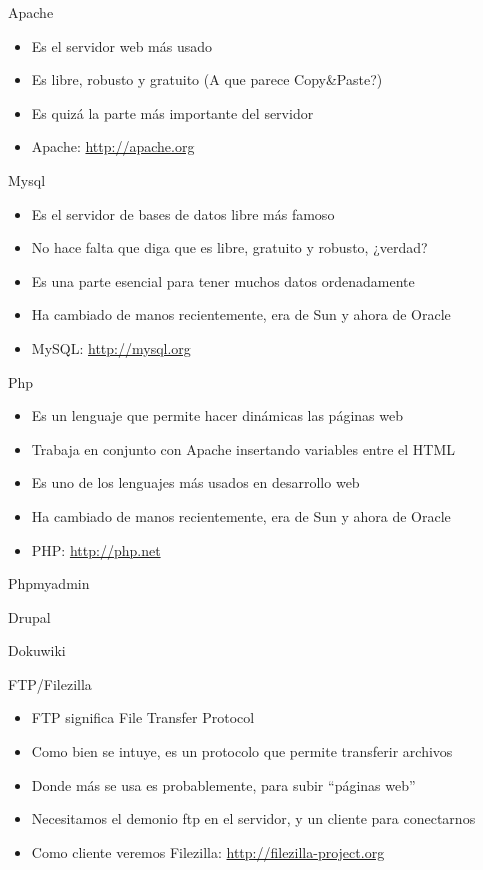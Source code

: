 \documentclass[spanish]{beamer}
\begin{document}
\begin{frame}{Apache}
\begin{itemize}
\item Es el servidor web más usado
\item Es libre, robusto y gratuito (A que parece Copy\&Paste?)
\item Es quizá la parte más importante del servidor
\item Apache: \url{http://apache.org}
\end{itemize}
\end{frame}
\begin{frame}{Mysql}
\begin{itemize}
\item Es el servidor de bases de datos libre más famoso
\item No hace falta que diga que es libre, gratuito y robusto, ¿verdad?
\item Es una parte esencial para tener muchos datos ordenadamente
\item Ha cambiado de manos recientemente, era de Sun y ahora de Oracle
\item MySQL: \url{http://mysql.org}
\end{itemize}
\end{frame}
\begin{frame}{Php}
\begin{itemize}
\item Es un lenguaje que permite hacer dinámicas las páginas web
\item Trabaja en conjunto con Apache insertando variables entre el HTML
\item Es uno de los lenguajes más usados en desarrollo web
\item Ha cambiado de manos recientemente, era de Sun y ahora de Oracle
\item PHP: \url{http://php.net}
\end{itemize}
\end{frame}
\begin{frame}{Phpmyadmin}
\end{frame}
\begin{frame}{Drupal}
\end{frame}
\begin{frame}{Dokuwiki}
\end{frame}
\begin{frame}{FTP/Filezilla}
\begin{itemize}
\item FTP significa File Transfer Protocol
\item Como bien se intuye, es un protocolo que permite transferir archivos
\item Donde más se usa es probablemente, para subir ``páginas web''
\item Necesitamos el demonio ftp en el servidor, y un cliente para conectarnos
\item Como cliente veremos Filezilla: \url{http://filezilla-project.org}
\end{itemize}
\end{frame}
\end{document}
